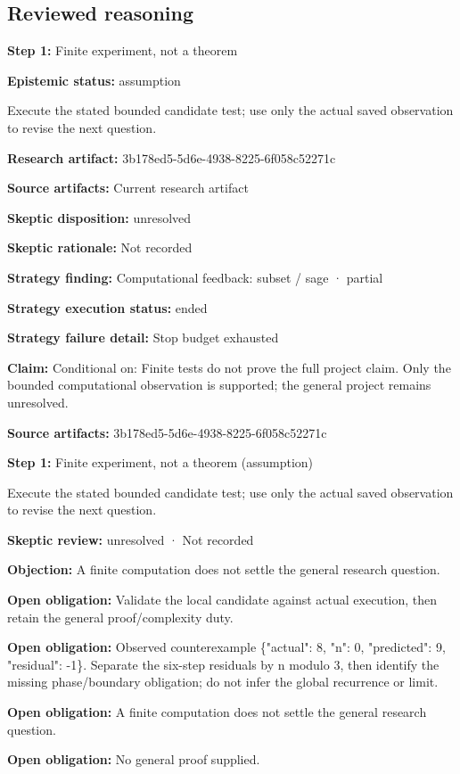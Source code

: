 \documentclass[11pt]{article}
\begin{document}
\subsection{Reviewed reasoning}
\textbf{Step 1:} Finite experiment, not a theorem\par
\textbf{Epistemic status:} assumption\par
Execute the stated bounded candidate test; use only the actual saved observation to revise the next question.\par
\textbf{Research artifact:} 3b178ed5-5d6e-4938-8225-6f058c52271c\par
\textbf{Source artifacts:} Current research artifact\par
\textbf{Skeptic disposition:} unresolved\par
\textbf{Skeptic rationale:} Not recorded\par
\textbf{Strategy finding:} Computational feedback: subset / sage · partial\par
\textbf{Strategy execution status:} ended\par
\textbf{Strategy failure detail:} Stop budget exhausted\par
\textbf{Claim:} Conditional on: Finite tests do not prove the full project claim. Only the bounded computational observation is supported; the general project remains unresolved.\par
\textbf{Source artifacts:} 3b178ed5-5d6e-4938-8225-6f058c52271c\par
\textbf{Step 1:} Finite experiment, not a theorem (assumption)\par
Execute the stated bounded candidate test; use only the actual saved observation to revise the next question.\par
\textbf{Skeptic review:} unresolved · Not recorded\par
\textbf{Objection:} A finite computation does not settle the general research question.\par
\textbf{Open obligation:} Validate the local candidate against actual execution, then retain the general proof/complexity duty.\par
\textbf{Open obligation:} Observed counterexample \{"actual": 8, "n": 0, "predicted": 9, "residual": -1\}. Separate the six-step residuals by n modulo 3, then identify the missing phase/boundary obligation; do not infer the global recurrence or limit.\par
\textbf{Open obligation:} A finite computation does not settle the general research question.\par
\textbf{Open obligation:} No general proof supplied.\par
\end{document}
